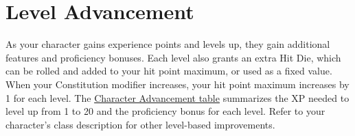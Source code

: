 \section{Level Advancement}\label{_level_advancement}

As your character gains experience points and levels up, they gain
additional features and proficiency bonuses. Each level also grants an
extra Hit Die, which can be rolled and added to your hit point maximum,
or used as a fixed value. When your Constitution modifier increases,
your hit point maximum increases by 1 for each level. The
\hyperref[level-advancement-character-advancement-table]{Character
Advancement table} summarizes the XP needed to level up from 1 to 20 and
the proficiency bonus for each level. Refer to your character's class
description for other level-based improvements.

